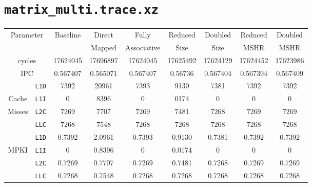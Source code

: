 \documentclass[11pt, swedish, openany]{book}
\begin{document}
\section{\texttt{matrix\_multi.trace.xz}}
\begin{table}[H]
    \begin{tabular}{||c|c||c||c|c||c|c||c|c||}
        \hline
        \multicolumn{2}{||c||}{\multirow{2}{*}{Parameter}} & \multirow{2}{*}{Baseline} & Direct   & Fully       & Reduced  & Doubled  & Reduced  & Doubled  \\
        \multicolumn{2}{||c||}{}                           &                           & Mapped   & Associative & Size     & Size     & MSHR     & MSHR     \\
        \hline
        \multicolumn{2}{||c||}{cycles}                     & 17624045                  & 17696897 & 17624045    & 17625492 & 17624129 & 17624452 & 17623986 \\
        \multicolumn{2}{||c||}{IPC}                        & 0.567407                  & 0.565071 & 0.567407    & 0.56736  & 0.567404 & 0.567394 & 0.567409 \\
        \hline
                                            & \texttt{L1D} & 7392                      & 20961    & 7393        & 9130     & 7381     & 7392     & 7392     \\
        Cache                               & \texttt{L1I} & 0                         & 8396     & 0           & 0174     & 0        & 0        & 0        \\
        Misses                              & \texttt{L2C} & 7269                      & 7707     & 7269        & 7481     & 7268     & 7269     & 7269     \\
                                            & \texttt{LLC} & 7268                      & 7548     & 7268        & 7268     & 7268     & 7268     & 7268     \\
        \hline
                                            & \texttt{L1D} & 0.7392                    & 2.0961   & 0.7393      & 0.9130   & 0.7381   & 0.7392   & 0.7392   \\
        \multirow{2}{*}{MPKI}               & \texttt{L1I} & 0                         & 0.8396   & 0           & 0.0174   & 0        & 0        & 0        \\
                                            & \texttt{L2C} & 0.7269                    & 0.7707   & 0.7269      & 0.7481   & 0.7268   & 0.7269   & 0.7269   \\
                                            & \texttt{LLC} & 0.7268                    & 0.7548   & 0.7268      & 0.7268   & 0.7268   & 0.7268   & 0.7268   \\

\end{tabular}
\end{table}
\end{document}
